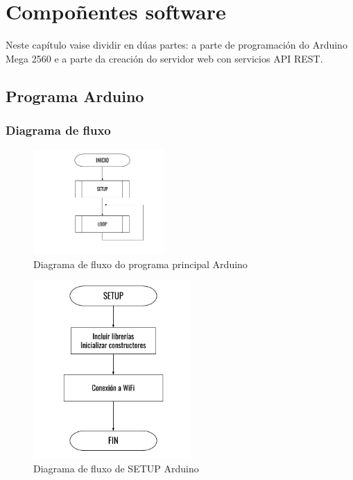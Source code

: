 \documentclass[11pt,twoside]{book}
\begin{document}
\chapter{Compoñentes software}

Neste capítulo vaise dividir en dúas partes: a parte de programación do Arduino Mega 2560 e a parte da creación do servidor web con servicios API REST.

\section{Programa Arduino}

\subsection{Diagrama de fluxo}

\begin{figure}[H]
	\begin{center}
		\includegraphics[width=5cm]{images/diagrama_flujo_inicio.png}
	\end{center}
	\caption{Diagrama de fluxo do programa principal Arduino}
	\label{fig:FluxoPrincipal}
\end{figure}

\begin{figure}[H]
	\begin{center}
		\includegraphics[width=6cm]{images/diagrama_flujo_setup.png}
	\end{center}
	\caption{Diagrama de fluxo de SETUP Arduino}
	\label{fig:FluxoSETUP}
\end{figure}
\end{document}
